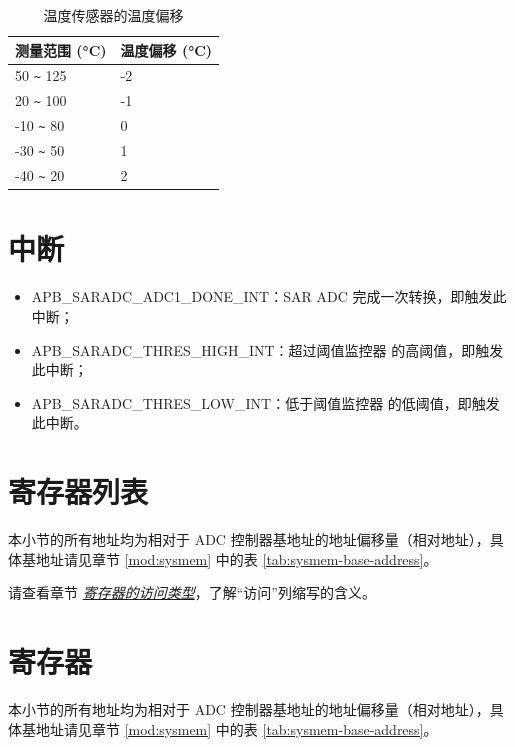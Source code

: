 \documentclass[main\_\_CN.tex]{subfiles}
\begin{document}
\begin{longtable}[c]{|p{4cm}|p{4cm}|}
    \caption{温度传感器的温度偏移}
    \label{tab:tsensor-dac}
    \\\hline
    \rowcolor{lightgray}
    测量范围 (°C)  & 温度偏移 (°C) \\\hline
    50 \verb+~+ 125 & -2 \\\hline
    20 \verb+~+ 100 & -1 \\\hline
    -10 \verb+~+ 80 & 0 \\\hline
    -30 \verb+~+ 50 & 1 \\\hline
    -40 \verb+~+ 20 & 2 \\\hline
\end{longtable}

\section{中断}

\begin{itemize}
   \item \label{int:SARADCDONEINT1} APB\_SARADC\_ADC1\_DONE\_INT：SAR ADC 完成一次转换，即触发此中断；
   \item \label{int:APBSARADCTHRESxHIGHINT} APB\_SARADC\_THRES\_HIGH\_INT：超过阈值监控器  的高阈值，即触发此中断；
    \item \label{int:APBSARADCTHRESxLOWINT} APB\_SARADC\_THRES\_LOW\_INT：低于阈值监控器  的低阈值，即触发此中断。
\end{itemize}

\section{寄存器列表}
本小节的所有地址均为相对于 ADC 控制器基地址的地址偏移量（相对地址），具体基地址请见章节 \ref{mod:sysmem} \textit{} 中的表 \ref{tab:sysmem-base-address}。

请查看章节 \hyperref[glossary-access-types]{\textit{寄存器的访问类型}}，了解“访问”列缩写的含义。



\section{寄存器}

本小节的所有地址均为相对于 ADC 控制器基地址的地址偏移量（相对地址），具体基地址请见章节 \ref{mod:sysmem} \textit{} 中的表 \ref{tab:sysmem-base-address}。


\end{document}
